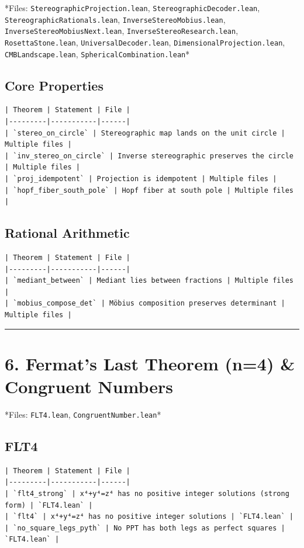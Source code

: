 \documentclass[12pt,a4paper,openany]{book}
\begin{document}
*Files: \texttt{StereographicProjection.lean}, \texttt{StereographicDecoder.lean}, \texttt{StereographicRationals.lean}, \texttt{InverseStereoMobius.lean}, \texttt{InverseStereoMobiusNext.lean}, \texttt{InverseStereoResearch.lean}, \texttt{RosettaStone.lean}, \texttt{UniversalDecoder.lean}, \texttt{DimensionalProjection.lean}, \texttt{CMBLandscape.lean}, \texttt{SphericalCombination.lean}*

\subsection{Core Properties}
\begin{verbatim}
| Theorem | Statement | File |
|---------|-----------|------|
| `stereo_on_circle` | Stereographic map lands on the unit circle | Multiple files |
| `inv_stereo_on_circle` | Inverse stereographic preserves the circle | Multiple files |
| `proj_idempotent` | Projection is idempotent | Multiple files |
| `hopf_fiber_south_pole` | Hopf fiber at south pole | Multiple files |
\end{verbatim}

\subsection{Rational Arithmetic}
\begin{verbatim}
| Theorem | Statement | File |
|---------|-----------|------|
| `mediant_between` | Mediant lies between fractions | Multiple files |
| `mobius_compose_det` | Möbius composition preserves determinant | Multiple files |
\end{verbatim}

\bigskip\hrule\bigskip

\section{6. Fermat's Last Theorem (n=4) \& Congruent Numbers}

*Files: \texttt{FLT4.lean}, \texttt{CongruentNumber.lean}*

\subsection{FLT4}
\begin{verbatim}
| Theorem | Statement | File |
|---------|-----------|------|
| `flt4_strong` | x⁴+y⁴=z⁴ has no positive integer solutions (strong form) | `FLT4.lean` |
| `flt4` | x⁴+y⁴=z⁴ has no positive integer solutions | `FLT4.lean` |
| `no_square_legs_pyth` | No PPT has both legs as perfect squares | `FLT4.lean` |
\end{verbatim}
\end{document}
